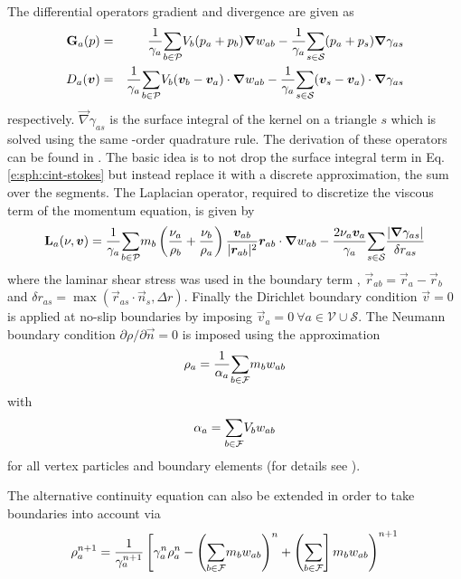 The differential operators gradient and divergence are given as
\begin{eqnarray}
\textbf{G}_a(p) &=& \frac{1}{\gamma_a}\underset{b \in \mathcal{P}}{\sum} V_b (p_a+p_b) \bm{\nabla} w_{ab}
 -\frac{1}{\gamma_a}\underset{s \in \mathcal{S}}{\sum} (p_a + p_s) \bm{\nabla} \gamma_{as}
\label{e:sa:grad}
\\
D_a(\bm{v}) &=& \frac{1}{\gamma_a}\underset{b \in \mathcal{P}}{\sum} V_b (\bm{v}_b - \bm{v}_a) \cdot \bm{\nabla} w_{ab}
 -\frac{1}{\gamma_a}\underset{s \in \mathcal{S}}{\sum} (\bm{v}_s - \bm{v}_a) \cdot \bm{\nabla} \gamma_{as}
\label{e:sa:div}
\end{eqnarray}
respectively. $\vec{\nabla} \gamma_{as}$ is the surface integral of the kernel
on a triangle $s$ which is solved using the same -order
quadrature rule. The derivation of these operators can be found in
\cite{ferrand_unified_2012}. The basic idea is to not drop the surface
integral term in Eq. \eqref{e:sph:cint-stokes} but instead replace it
with a discrete approximation, \ie the sum over the segments. The Laplacian operator, required to discretize the viscous term of the momentum equation, is given by
\begin{equation}
\textbf{L}_a(\nu, \bm{v}) = \frac{1}{\gamma_a}\underset{b \in \mathcal{P}}{\sum} m_b \left(\frac{\nu_a}{\rho_b} + \frac{\nu_b}{\rho_a}\right) \frac{\bm{v}_{ab}}{|\bm{r}_{ab}|^2}\bm{r}_{ab}\cdot \bm{\nabla} w_{ab}
 - \frac{2 \nu_a \bm{v}_a}{\gamma_a} \underset{s \in \mathcal{S}}{\sum} \frac{|\bm{\nabla} \gamma_{as}|}{\delta r_{as}}
\label{e:sa:lap}
\end{equation}
where the laminar shear stress was used in the boundary term \cite{ferrand_unified_2012}, $\vec{r}_{ab} = \vec{r}_a - \vec{r}_b$ and $\delta r_{as} = \max(\vec{r}_{as}\cdot\vec{n}_s, \Delta r)$. Finally the Dirichlet boundary condition $\vec{v} = 0$ is applied at no-slip boundaries by imposing $\vec{v}_a = 0\ \forall a \in \mathcal{V} \cup \mathcal{S}$. The Neumann boundary condition $\partial \rho/\partial \vec{n} = 0$ is imposed using the approximation
\begin{equation}
\rho_a = \frac{1}{\alpha_a}\underset{b \in \mathcal{F}}{\sum} m_b w_{ab}
\end{equation}
with
\begin{equation}
\alpha_a = \underset{b \in \mathcal{F}}{\sum} V_b w_{ab}
\label{e:sa:alpha}
\end{equation}
for all vertex particles and boundary elements (for details see \cite{mayrhofer_investigation_2013}).

The alternative continuity equation can also be extended in order to
take boundaries into account via
\begin{equation}
\rho_a^{n+1} = \frac{1}{\gamma_a^{n+1}}\left[\gamma_a^n \rho_a^n - \left(\underset{b \in \mathcal{F}}{\sum} m_b
w_{ab}\right)^n + \left(\underset{b \in \mathcal{F}}{\sum}\right]
m_b w_{ab}\right)^{n+1}
\label{e:sa:sumrho-time}
\end{equation}

